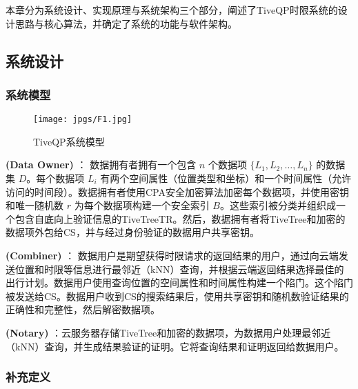 \documentclass{cumcmthesis}
\numberwithin{equation}{section} %
\numberwithin{figure}{section} %
\numberwithin{table}{section} %
\begin{document}
本章分为系统设计、实现原理与系统架构三个部分，阐述了TiveQP时限系统的设计思路与核心算法，并确定了系统的功能与软件架构。

\subsection{系统设计}
\subsubsection{系统模型}

\begin{figure}[h]
    \centering
    \texttt{[image: jpgs/F1.jpg]} %
    \caption{TiveQP系统模型}
    \label{fig:tiveqp_model}
\end{figure}
	
	\textbf{\bfseries{}(Data Owner) }： 数据拥有者拥有一个包含 \(n\) 个数据项 \(\{L_1, L_2, \ldots, L_n\}\) 的数据集 \(D\)。每个数据项 \(L_i\) 有两个空间属性（位置类型和坐标）和一个时间属性（允许访问的时间段）。数据拥有者使用CPA安全加密算法加密每个数据项，并使用密钥和唯一随机数 \(r\) 为每个数据项构建一个安全索引 \(B\)。这些索引被分类并组织成一个包含自底向上验证信息的TiveTreeTR。然后，数据拥有者将TiveTree和加密的数据项外包给CS，并与经过身份验证的数据用户共享密钥。\par
	
	\textbf{\bfseries{} (Combiner) }： 数据用户是期望获得时限请求的返回结果的用户，通过向云端发送位置和时限等信息进行最邻近（kNN）查询，并根据云端返回结果选择最佳的出行计划。数据用户使用查询位置的空间属性和时间属性构建一个陷门。这个陷门被发送给CS。数据用户收到CS的搜索结果后，使用共享密钥和随机数验证结果的正确性和完整性，然后解密数据项。\par
	
	\textbf{\bfseries{} (Notary) }：云服务器存储TiveTree和加密的数据项，为数据用户处理最邻近（kNN）查询，并生成结果验证的证明。它将查询结果和证明返回给数据用户。\par
	
\subsubsection{补充定义}
\end{document}
